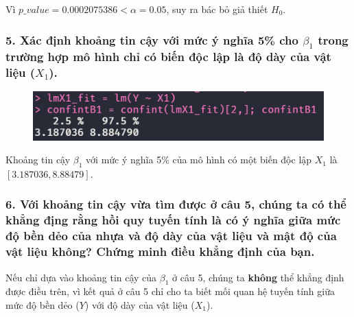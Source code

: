\documentclass[a4paper]{article}
\theoremstyle{nonumberplain}
\begin{document}
Vì $p\_value = 0.0002075386 < \alpha = 0.05$, suy ra bác bỏ giả thiết $H_0$.

\subsubsection*{5. Xác định khoảng tin cậy với mức ý nghĩa 5\% cho $\beta_1$ trong trường hợp mô hình chỉ có biến độc lập là độ dày của vật liệu ($X_1$).}

\begin{figure}[h!]
	\centering
	\includegraphics[width=0.7\linewidth]{bai-2-5-confint-beta1}
	\label{fig:bai-2-5-confint-beta1}
\end{figure}

Khoảng tin cậy $\beta_1$ với mức ý nghĩa 5\% của mô hình có một biến độc lập $X_1$ là $[3.187036,8.88479]$.

\subsubsection*{6. Với khoảng tin cậy vừa tìm được ở câu 5, chúng ta có thể khẳng địng rằng hồi quy tuyến tính là có ý nghĩa giữa mức độ bền dẻo của nhựa và độ dày của vật liệu và mật độ của vật liệu không? Chứng minh điều khẳng định của bạn.}

Nếu chỉ dựa vào khoảng tin cậy của $\beta_1$ ở câu 5, chúng ta \textbf{không} thể khẳng định được điều trên, vì kết quả ở câu 5 chỉ cho ta biết mối quan hệ tuyến tính giữa mức độ bền dẻo ($Y$) với độ dày của vật liệu ($X_1$).
\end{document}
